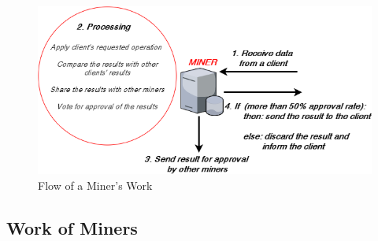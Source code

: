 \documentclass{article}
\begin{document}
\begin{figure}[h]
  \includegraphics[width=0.5\linewidth]{figures/miner_work_diagram.png}
  \caption{Flow of a Miner's Work}
  \label{fig:miner_work_flow}
\end{figure}


\subsection{Work of Miners}\label{ssec:work_of_miners}


     
\newpage


\end{document}
